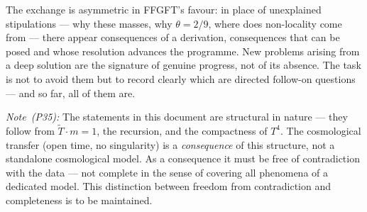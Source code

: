 The exchange is asymmetric in FFGFT's favour: in place of unexplained
stipulations --- why these masses, why $\theta = 2/9$,
where does non-locality come from --- there appear consequences of a
derivation, consequences that can be posed and whose resolution advances the
programme. New problems arising from a deep solution are the signature of
genuine progress, not of its absence. The task is not to avoid them but to
record clearly which are directed follow-on questions --- and so far, all of
them are.

\bigskip
\noindent\textit{Note~(P35):} The statements in this document are structural
in nature --- they follow from $\tilde{T} \cdot m = 1$, the recursion, and
the compactness of $T^4$. The cosmological transfer (open time, no
singularity) is a \emph{consequence} of this structure, not a standalone
cosmological model. As a consequence it must be free of contradiction with
the data --- not complete in the sense of covering all phenomena of a
dedicated model. This distinction between freedom from contradiction and
completeness is to be maintained.
